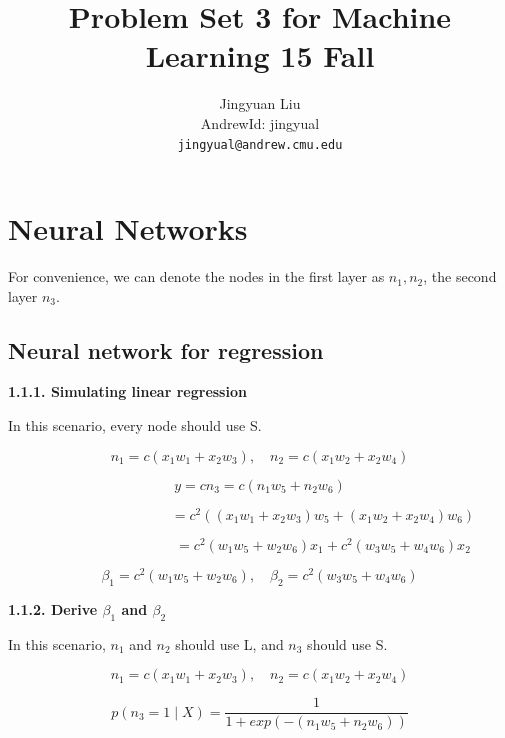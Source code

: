 \documentclass{article} %
\title{Problem Set 3 for Machine Learning 15 Fall}
\author{
Jingyuan Liu\\
AndrewId: jingyual\\
\texttt{jingyual@andrew.cmu.edu} \\
}
\begin{document}
\maketitle



\section{Neural Networks}


For convenience, we can denote the nodes in the first layer as $n_1, n_2$, the
second layer $n_3$.

\subsection{Neural network for regression}
\textbf{1.1.1. Simulating linear regression}

In this scenario, every node should use S.

\begin{equation}
n_1 = c(x_1 w_1 + x_2 w_3), \quad
n_2 = c(x_1 w_2 + x_2 w_4)
\end{equation}

\begin{equation}
y = c n_3 =  c(n_1 w_5 + n_2 w_6)
\end{equation}

\begin{equation}
\qquad \qquad \qquad \qquad \quad
= c^2 ((x_1 w_1 + x_2 w_3) w_5 + (x_1 w_2 + x_2 w_4) w_6)
\end{equation}

\begin{equation}
\qquad \qquad \qquad \qquad \quad
= c^2 (w_1 w_5 + w_2 w_6) x_1 + c^2 (w_3 w_5 + w_4 w_6) x_2
\end{equation}

\begin{equation}
\beta_1 = c^2 (w_1 w_5 + w_2 w_6),  \quad
\beta_2 = c^2 (w_3 w_5 + w_4 w_6)
\end{equation}

\textbf{1.1.2. Derive $\beta_1$ and $\beta_2$}

In this scenario, $n_1$ and $n_2$ should use L, and $n_3$ should use S.

\begin{equation}
n_1 = c(x_1 w_1 + x_2 w_3), \quad
n_2 = c(x_1 w_2 + x_2 w_4)
\end{equation}

\begin{equation}
p(n_3 = 1 \mid X) = \frac{1}{1 + exp(-(n_1 w_5 + n_2 w_6))}
\end{equation}
\end{document}
